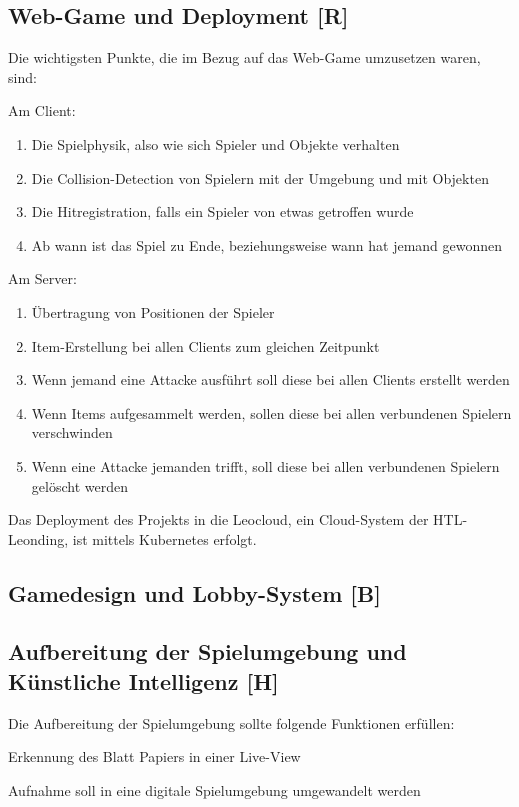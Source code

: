 \subsection{Web-Game und Deployment [R]}
Die wichtigsten Punkte, die im Bezug auf das Web-Game umzusetzen waren, sind:
\begin{compactitem}
    \item Am Client:
    \begin{enumerate}
        \item Die Spielphysik, also wie sich Spieler und Objekte verhalten
        \item Die Collision-Detection von Spielern mit der Umgebung und mit Objekten
        \item Die Hitregistration, falls ein Spieler von etwas getroffen wurde
        \item Ab wann ist das Spiel zu Ende, beziehungsweise wann hat jemand gewonnen
    \end{enumerate}
    \item Am Server:
    \begin{enumerate}
        \item Übertragung von Positionen der Spieler
        \item Item-Erstellung bei allen Clients zum gleichen Zeitpunkt
        \item Wenn jemand eine Attacke ausführt soll diese bei allen Clients erstellt werden
        \item Wenn Items aufgesammelt werden, sollen diese bei allen verbundenen Spielern verschwinden
        \item Wenn eine Attacke jemanden trifft, soll diese bei allen verbundenen Spielern gelöscht werden
    \end{enumerate}

\end{compactitem}
Das Deployment des Projekts in die Leocloud, ein Cloud-System der HTL-Leonding, ist mittels Kubernetes erfolgt.


\subsection{Gamedesign und Lobby-System [B]}

\subsection{Aufbereitung der Spielumgebung und Künstliche Intelligenz [H]}
Die Aufbereitung der Spielumgebung sollte folgende Funktionen erfüllen:
\begin{compactitem}
    \item Erkennung des Blatt Papiers in einer Live-View
    \item Aufnahme soll in eine digitale Spielumgebung umgewandelt werden
\end{compactitem}

